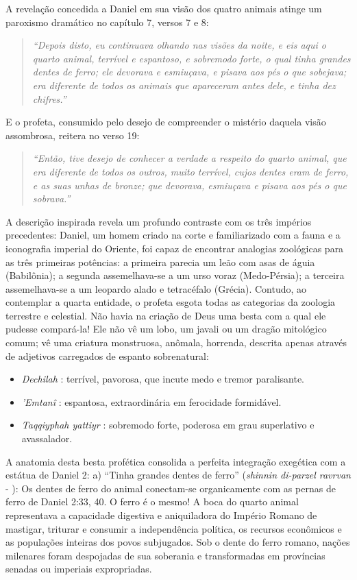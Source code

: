 A revelação concedida a Daniel em sua visão dos quatro animais atinge um paroxismo dramático no capítulo 7, versos 7 e 8:

\begin{quote}
\itshape ``Depois disto, eu continuava olhando nas visões da noite, e eis aqui o quarto animal, terrível e espantoso, e sobremodo forte, o qual tinha grandes dentes de ferro; ele devorava e esmiuçava, e pisava aos pés o que sobejava; era diferente de todos os animais que apareceram antes dele, e tinha dez chifres.''
\end{quote}

E o profeta, consumido pelo desejo de compreender o mistério daquela visão assombrosa, reitera no verso 19:

\begin{quote}
\itshape ``Então, tive desejo de conhecer a verdade a respeito do quarto animal, que era diferente de todos os outros, muito terrível, cujos dentes eram de ferro, e as suas unhas de bronze; que devorava, esmiuçava e pisava aos pés o que sobrava.''
\end{quote}


A descrição inspirada revela um profundo contraste com os três impérios precedentes:
Daniel, um homem criado na corte e familiarizado com a fauna e a iconografia imperial do Oriente, foi capaz de encontrar analogias zoológicas para as três primeiras potências: a primeira parecia um leão com asas de águia (Babilônia); a segunda assemelhava-se a um urso voraz (Medo-Pérsia); a terceira assemelhava-se a um leopardo alado e tetracéfalo (Grécia). Contudo, ao contemplar a quarta entidade, o profeta esgota todas as categorias da zoologia terrestre e celestial. Não havia na criação de Deus uma besta com a qual ele pudesse compará-la! Ele não vê um lobo, um javali ou um dragão mitológico comum; vê uma criatura monstruosa, anômala, horrenda, descrita apenas através de adjetivos carregados de espanto sobrenatural:
\begin{itemize}
  \item \textit{Dechilah} : terrível, pavorosa, que incute medo e tremor paralisante.
  \item \textit{'Emtanî} : espantosa, extraordinária em ferocidade formidável.
  \item \textit{Taqqiyphah yattiyr} : sobremodo forte, poderosa em grau superlativo e avassalador.
\end{itemize}


A anatomia desta besta profética consolida a perfeita integração exegética com a estátua de Daniel 2:
a) ``Tinha grandes dentes de ferro'' (\textit{shinnin di-parzel ravrvan} - ): Os dentes de ferro do animal conectam-se organicamente com as pernas de ferro de Daniel 2:33, 40. O ferro é o mesmo! A boca do quarto animal representava a capacidade digestiva e aniquiladora do Império Romano de mastigar, triturar e consumir a independência política, os recursos econômicos e as populações inteiras dos povos subjugados. Sob o dente do ferro romano, nações milenares foram despojadas de sua soberania e transformadas em províncias senadas ou imperiais expropriadas.

